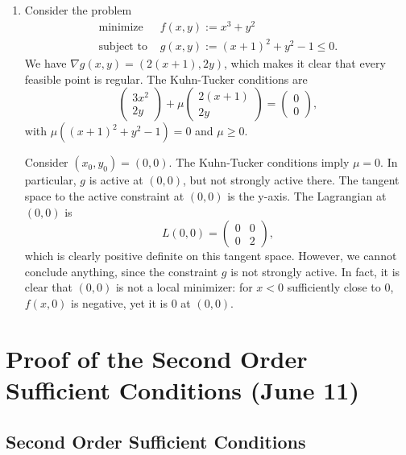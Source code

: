 \documentclass[11pt]{book}
\begin{document}
\begin{enumerate}
\item
Consider the problem
\begin{align*}
\text{minimize } &f(x,y) := x^3 + y^2 \\
\text{subject to } &g(x,y) := (x+1)^2 + y^2 - 1 \leq 0.
\end{align*}
We have $\nabla g(x,y) = (2(x+1), 2y)$, which makes it clear that every feasible point is regular. The Kuhn-Tucker conditions are
\[
\begin{pmatrix}
3x^2 \\ 2y
\end{pmatrix} + \mu \begin{pmatrix}
2(x+1) \\ 2y
\end{pmatrix} = \begin{pmatrix}
0 \\ 0
\end{pmatrix},
\]
with $\mu((x+1)^2 + y^2 - 1) = 0$ and $\mu \geq 0$.

Consider $(x_0, y_0) = (0,0)$. The Kuhn-Tucker conditions imply $\mu = 0$. In particular, $g$ is active at $(0,0)$, but not strongly active there. The tangent space to the active constraint at $(0,0)$ is the y-axis. The Lagrangian at $(0,0)$ is
\[
L(0,0) = \begin{pmatrix}
0 & 0 \\ 0 & 2
\end{pmatrix},
\]
which is clearly positive definite on this tangent space. However, we cannot conclude anything, since the constraint $g$ is not strongly active. In fact, it is clear that $(0,0)$ is not a local minimizer: for $x<0$ sufficiently close to $0$, $f(x,0)$ is negative, yet it is $0$ at $(0,0)$.
\end{enumerate}

\newpage

\section{Proof of the Second Order Sufficient Conditions (June 11)}

\subsection{Second Order Sufficient Conditions}
\end{document}
